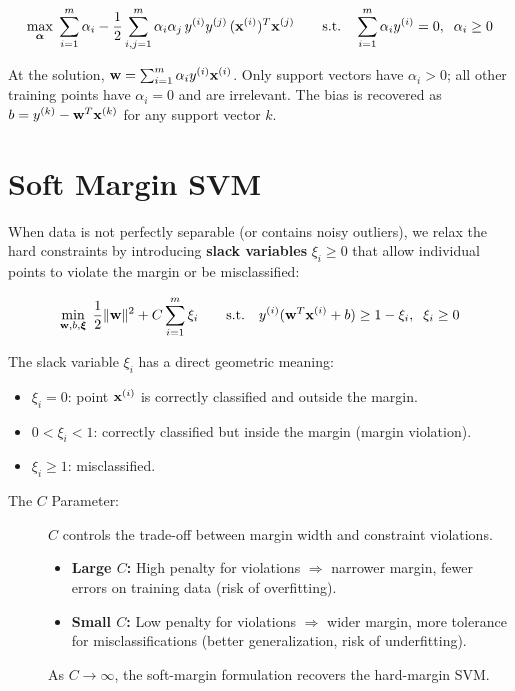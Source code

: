 $$\max_{\boldsymbol{\alpha}} \;\sum_{i=1}^{m} \alpha_i - \frac{1}{2}\sum_{i,j=1}^{m} \alpha_i \alpha_j \, y^{(i)} y^{(j)} \, (\mathbf{x}^{(i)})^T\mathbf{x}^{(j)} \qquad \text{s.t.} \quad \sum_{i=1}^{m} \alpha_i y^{(i)} = 0, \;\; \alpha_i \geq 0$$

At the solution, $\mathbf{w} = \sum_{i=1}^{m} \alpha_i y^{(i)} \mathbf{x}^{(i)}$. Only support vectors have $\alpha_i > 0$; all other training points have $\alpha_i = 0$ and are irrelevant. The bias is recovered as $b = y^{(k)} - \mathbf{w}^T\mathbf{x}^{(k)}$ for any support vector $k$.

\section*{Soft Margin SVM}

When data is not perfectly separable (or contains noisy outliers), we relax the hard constraints by introducing \textbf{slack variables} $\xi_i \geq 0$ that allow individual points to violate the margin or be misclassified:

$$\min_{\mathbf{w}, b, \boldsymbol{\xi}} \;\frac{1}{2}\|\mathbf{w}\|^2 + C \sum_{i=1}^{m} \xi_i \qquad \text{s.t.} \quad y^{(i)}(\mathbf{w}^T\mathbf{x}^{(i)} + b) \geq 1 - \xi_i, \;\; \xi_i \geq 0$$

The slack variable $\xi_i$ has a direct geometric meaning:
\begin{itemize}
    \item $\xi_i = 0$: point $\mathbf{x}^{(i)}$ is correctly classified and outside the margin.
    \item $0 < \xi_i < 1$: correctly classified but inside the margin (margin violation).
    \item $\xi_i \geq 1$: misclassified.
\end{itemize}

\begin{description}
    \item[The $C$ Parameter:] $C$ controls the trade-off between margin width and constraint violations.
    \begin{itemize}
        \item \textbf{Large $C$:} High penalty for violations $\Rightarrow$ narrower margin, fewer errors on training data (risk of overfitting).
        \item \textbf{Small $C$:} Low penalty for violations $\Rightarrow$ wider margin, more tolerance for misclassifications (better generalization, risk of underfitting).
    \end{itemize}
    As $C \to \infty$, the soft-margin formulation recovers the hard-margin SVM.
\end{description}


